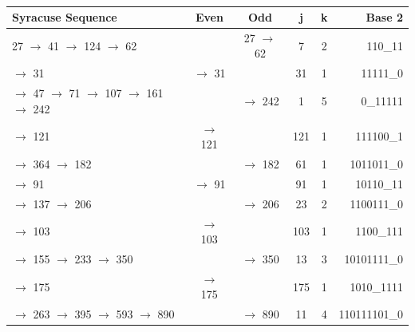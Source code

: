 \documentclass[letterpaper]{article}
\begin{document}
\begin{multicols}{2}
    \begin{table}[th]
        \centering
        \begin{tabular}{|l|c|c|c|c|r|}
            \hline
            \textbf{Syracuse Sequence}                      & \textbf{Even} & \textbf{Odd} & \textbf{j} & \textbf{k} & \textbf{Base 2} \\
            \hline
            27 $\to$ 41 $\to$ 124 $\to$ 62                  &               & 27 $\to$ 62  & 7          & 2          & 110\_11         \\
            \hline
            $\to$ 31                                        & $\to$ 31      &              & 31         & 1          & 11111\_0        \\
            \hline
            $\to$ 47 $\to$ 71 $\to$ 107 $\to$ 161 $\to$ 242 &               & $\to$ 242    & 1          & 5          & 0\_11111        \\
            \hline
            $\to$ 121                                       & $\to$ 121     &              & 121        & 1          & 111100\_1       \\
            \hline
            $\to$ 364 $\to$ 182                             &               & $\to$ 182    & 61         & 1          & 1011011\_0      \\
            \hline
            $\to$ 91                                        & $\to$ 91      &              & 91         & 1          & 10110\_11       \\
            \hline
            $\to$ 137 $\to$ 206                             &               & $\to$ 206    & 23         & 2          & 1100111\_0      \\
            \hline
            $\to$ 103                                       & $\to$ 103     &              & 103        & 1          & 1100\_111       \\
            \hline
            $\to$ 155 $\to$ 233 $\to$ 350                   &               & $\to$ 350    & 13         & 3          & 10101111\_0     \\
            \hline
            $\to$ 175                                       & $\to$ 175     &              & 175        & 1          & 1010\_1111      \\
            \hline
            $\to$ 263 $\to$ 395 $\to$ 593 $\to$ 890         &               & $\to$ 890    & 11         & 4          & 110111101\_0    \\
            \hline
        \end{tabular}
        \caption{}
    \end{table}


\end{multicols}
\end{document}
